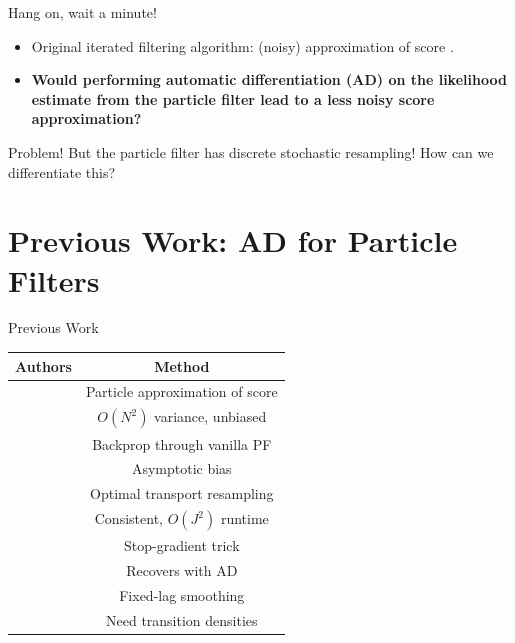 \documentclass{beamer}
\begin{document}
\begin{frame}{Hang on, wait a minute!}
    \begin{itemize}
        \item Original iterated filtering algorithm: (noisy) approximation of score \citep{ionides06-pnas}. 
        \pause
        \item \textbf{Would performing automatic differentiation (AD) on the likelihood estimate from the particle filter lead to a less noisy score approximation?}
    \end{itemize}
    \pause
    \begin{block}{Problem!}
        But the particle filter has discrete stochastic resampling! How can we differentiate this?
    \end{block}
\end{frame}

\section{Previous Work: AD for Particle Filters}


\begin{frame}{Previous Work}

    \begin{table}[h!]
        \centering
        \begin{tabular}{||c c||} 
         \hline
         Authors & Method \\ [0.5ex] 
         \hline\hline
         \cite{poyiadjis11} & Particle approximation of score
         \\ & $O(N^2)$ variance, unbiased \\
         \hline
         \cite{naesseth18} & Backprop through vanilla PF \\ 
         & Asymptotic bias \\
         \hline
         \cite{corenflos21} & Optimal transport resampling \\
         & Consistent, $O(J^2)$ runtime \\
         \hline
         \cite{scibior21} & Stop-gradient trick \\ 
         & Recovers \cite{poyiadjis11} with AD \\
         \hline 
         \cite{singh22} & Fixed-lag smoothing \\ 
         & Need transition densities \\ 
         \hline
        \end{tabular}
        \label{table:lit-review}
    \end{table}
\end{frame}
\end{document}
